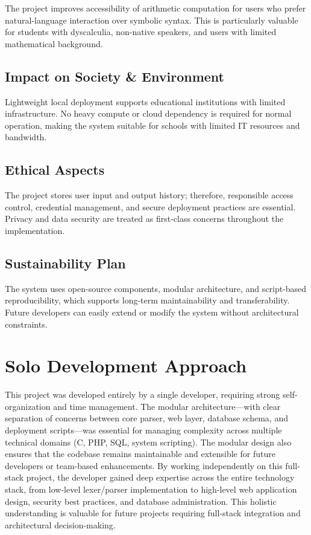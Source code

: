 \documentclass[12pt,a4paper]{report}
\begin{document}
The project improves accessibility of arithmetic computation for users who prefer natural-language
interaction over symbolic syntax. This is particularly valuable for students with dyscalculia, non-native speakers,
and users with limited mathematical background.

\subsection{Impact on Society \& Environment}

Lightweight local deployment supports educational institutions with limited infrastructure. No heavy compute or cloud dependency
is required for normal operation, making the system suitable for schools with limited IT resources and bandwidth.

\subsection{Ethical Aspects}

The project stores user input and output history; therefore, responsible access control, credential management, and secure deployment practices are essential.
Privacy and data security are treated as first-class concerns throughout the implementation.

\subsection{Sustainability Plan}

The system uses open-source components, modular architecture, and script-based reproducibility, which supports long-term maintainability and transferability.
Future developers can easily extend or modify the system without architectural constraints.

\section{Solo Development Approach}

This project was developed entirely by a single developer, requiring strong self-organization and time management.
The modular architecture---with clear separation of concerns between core parser, web layer, database schema, and deployment scripts---was
essential for managing complexity across multiple technical domains (C, PHP, SQL, system scripting). The modular design also ensures
that the codebase remains maintainable and extensible for future developers or team-based enhancements. By working independently on this full-stack project, the developer
gained deep expertise across the entire technology stack, from low-level lexer/parser implementation to high-level web application design,
security best practices, and database administration. This holistic understanding is valuable for future projects requiring full-stack
integration and architectural decision-making.
\end{document}
